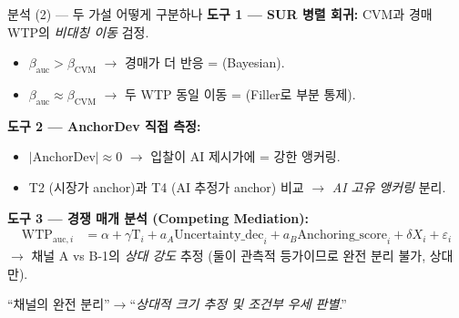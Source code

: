 \documentclass[aspectratio=169]{beamer}
\begin{document}
\begin{frame}{분석 (2) --- 두 가설 어떻게 구분하나}
  \textbf{도구 1 --- SUR 병렬 회귀:} CVM과 경매 WTP의 \emph{비대칭 이동} 검정.
  \begin{itemize}\itemsep0.05em
    \item $\beta_{\text{auc}} > \beta_{\text{CVM}}$ $\rightarrow$ 경매가 더 반응 =  (Bayesian).
    \item $\beta_{\text{auc}} \approx \beta_{\text{CVM}}$ $\rightarrow$ 두 WTP 동일 이동 =  (Filler로 부분 통제).
  \end{itemize}

  \vspace{0.4em}
  \textbf{도구 2 --- AnchorDev 직접 측정:}
  \begin{itemize}\itemsep0.05em
    \item $|\mathrm{AnchorDev}| \approx 0$ $\rightarrow$ 입찰이 AI 제시가에  = 강한 앵커링.
    \item T2 (시장가 anchor)과 T4 (AI 추정가 anchor) 비교 $\rightarrow$ \emph{AI 고유 앵커링} 분리.
  \end{itemize}

  \vspace{0.4em}
  \textbf{도구 3 --- 경쟁 매개 분석 (Competing Mediation):}
  \begin{align*}
    \mathrm{WTP}_{\text{auc},i} &= \alpha + \gamma \mathrm{T}_i + a_A \mathrm{Uncertainty\_dec}_i + a_B \mathrm{Anchoring\_score}_i + \delta X_i + \varepsilon_i
  \end{align*}
  $\rightarrow$ 채널 A vs B-1의 \emph{상대 강도} 추정 (둘이 관측적 등가이므로 완전 분리 불가, 상대만).

  \vspace{0.3em}
   ``채널의 완전 분리''$\rightarrow$``\emph{상대적 크기 추정 및 조건부 우세 판별}.''
\end{frame}
\end{document}
